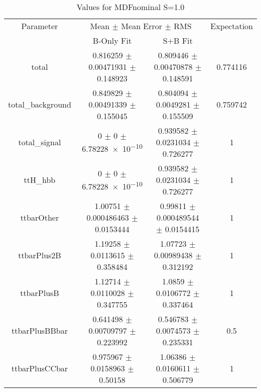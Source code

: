 \begin{table}
\centering
\caption{Values for MDFnominal S=1.0}
\begin{tabular}{cccc}
\toprule
Parameter & \multicolumn{2}{c}{Mean $\pm$ Mean Error $\pm$ RMS} & Expectation\\
 & B-Only Fit & S+B Fit & \\
\midrule
total & \num{0.816259} $\pm$ \num{0.00471931} $\pm$ \num{0.148923} & \num{0.809446} $\pm$ \num{0.00470878} $\pm$ \num{0.148591} & \num{0.774116}\\
total\_background & \num{0.849829} $\pm$ \num{0.00491339} $\pm$ \num{0.155045} & \num{0.804094} $\pm$ \num{0.0049281} $\pm$ \num{0.155509} & \num{0.759742}\\
total\_signal & \num{0} $\pm$ \num{0} $\pm$ \num{6.78228e-10} & \num{0.939582} $\pm$ \num{0.0231034} $\pm$ \num{0.726277} & \num{1}\\
ttH\_hbb & \num{0} $\pm$ \num{0} $\pm$ \num{6.78228e-10} & \num{0.939582} $\pm$ \num{0.0231034} $\pm$ \num{0.726277} & \num{1}\\
ttbarOther & \num{1.00751} $\pm$ \num{0.000486463} $\pm$ \num{0.0153444} & \num{0.99811} $\pm$ \num{0.000489544} $\pm$ \num{0.0154415} & \num{1}\\
ttbarPlus2B & \num{1.19258} $\pm$ \num{0.0113615} $\pm$ \num{0.358484} & \num{1.07723} $\pm$ \num{0.00989438} $\pm$ \num{0.312192} & \num{1}\\
ttbarPlusB & \num{1.12714} $\pm$ \num{0.0110028} $\pm$ \num{0.347755} & \num{1.0859} $\pm$ \num{0.0106772} $\pm$ \num{0.337464} & \num{1}\\
ttbarPlusBBbar & \num{0.641498} $\pm$ \num{0.00709797} $\pm$ \num{0.223992} & \num{0.546783} $\pm$ \num{0.0074573} $\pm$ \num{0.235331} & \num{0.5}\\
ttbarPlusCCbar & \num{0.975967} $\pm$ \num{0.0158963} $\pm$ \num{0.50158} & \num{1.06386} $\pm$ \num{0.0160611} $\pm$ \num{0.506779} & \num{1}\\
\bottomrule
\end{tabular}
\end{table}
